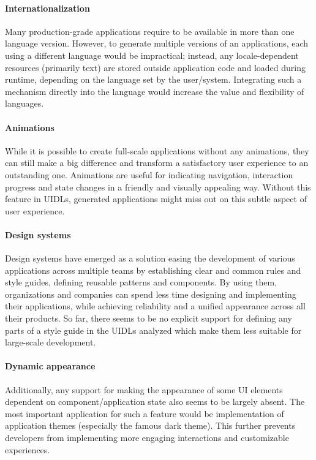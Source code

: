 \paragraph{Internationalization}
Many production-grade applications require to be available in more than one language version.
However, to generate multiple versions of an applications, each using a different language would be impractical;
instead, any locale-dependent resources (primarily text) are stored outside application code and loaded during runtime, depending on the language set by the user/system.
Integrating such a mechanism directly into the language would increase the value and flexibility of languages.


\paragraph{Animations}
While it is possible to create full-scale applications without any animations, they can still make a big difference and transform a satisfactory user experience to an outstanding one.
Animations are useful for indicating navigation, interaction progress and state changes in a friendly and visually appealing way.
Without this feature in UIDLs, generated applications might miss out on this subtle aspect of user experience.

\paragraph{Design systems}
Design systems have emerged as a solution easing the development of various applications across multiple teams by establishing clear and common rules and style guides, defining reusable patterns and components.
By using them, organizations and companies can spend less time designing and implementing their applications, while achieving reliability and a unified appearance across all their products.
So far, there seems to be no explicit support for defining any parts of a style guide in the UIDLs analyzed which make them less suitable for large-scale development.

\paragraph{Dynamic appearance}
Additionally, any support for making the appearance of some UI elements dependent on component/application state also seems to be largely absent.
The most important application for such a feature would be implementation of application themes (especially the famous dark theme).
This further prevents developers from implementing more engaging interactions and customizable experiences.
